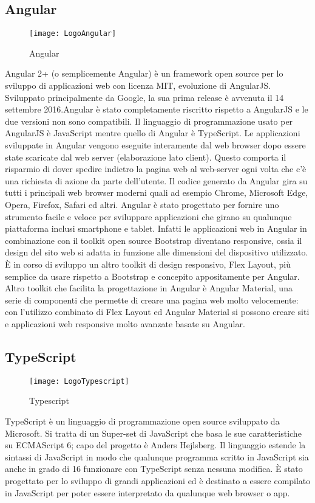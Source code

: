 \subsection{Angular}
\begin{figure}[htpb!]
\center
  \texttt{[image: LogoAngular]}
  \caption{Angular}
\end{figure}
Angular 2+ (o semplicemente Angular) è un framework open source per lo sviluppo di applicazioni web con licenza MIT, evoluzione di AngularJS. Sviluppato principalmente da Google, la sua prima release è avvenuta il 14 settembre 2016.Angular è stato completamente riscritto rispetto a AngularJS e le due versioni non sono compatibili. Il linguaggio di programmazione usato per AngularJS è JavaScript mentre quello di Angular è TypeScript. Le applicazioni sviluppate in Angular vengono eseguite interamente dal web browser dopo essere state scaricate dal web server (elaborazione lato client). Questo comporta il risparmio di dover spedire indietro la pagina web al web-server ogni volta che c'è una richiesta di azione da parte dell'utente. Il codice generato da Angular gira su tutti i principali web browser moderni quali ad esempio Chrome, Microsoft Edge, Opera, Firefox, Safari ed altri. Angular è stato progettato per fornire uno strumento facile e veloce per sviluppare applicazioni che girano su qualunque piattaforma inclusi smartphone e tablet. Infatti le applicazioni web in Angular in combinazione con il toolkit open source Bootstrap diventano responsive, ossia il design del sito web si adatta in funzione alle dimensioni del dispositivo utilizzato. È in corso di sviluppo un altro toolkit di design responsivo, Flex Layout, più semplice da usare rispetto a Bootstrap e concepito appositamente per Angular. Altro toolkit che facilita la progettazione in Angular è Angular Material, una serie di componenti che permette di creare una pagina web molto velocemente: con l'utilizzo combinato di Flex Layout ed Angular Material si possono creare siti e applicazioni web responsive molto avanzate basate su Angular.
\subsection{TypeScript}
\begin{figure}[htpb!]
\center
  \texttt{[image: LogoTypescript]}
  \caption{Typescript}
\end{figure}
TypeScript è un linguaggio di programmazione open source sviluppato da Microsoft. Si tratta di un Super-set di JavaScript che basa le sue caratteristiche su ECMAScript 6; capo del progetto è Anders Hejlsberg. Il linguaggio estende la sintassi di JavaScript in modo che qualunque programma scritto in JavaScript sia anche in grado di
16
funzionare con TypeScript senza nessuna modifica. È stato progettato per lo sviluppo di grandi applicazioni ed è destinato a essere compilato in JavaScript per poter essere interpretato da qualunque web browser o app.
